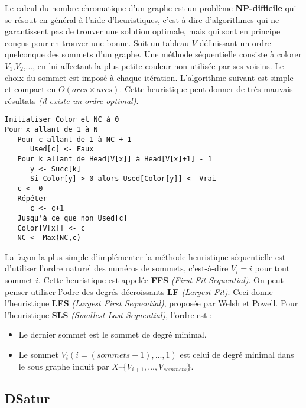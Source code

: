 \documentclass{article}
\begin{document}
Le calcul du nombre chromatique d’un graphe est un problème \textbf{NP-difficile} qui se résout en général à l’aide d’heuristiques, c’est-à-dire d’algorithmes qui ne garantissent 
pas de trouver une solution optimale, mais qui sont en principe conçus pour en trouver une bonne. Soit un tableau $V$ définissant un ordre quelconque des sommets d’un graphe. 
Une méthode séquentielle consiste à colorer $V_1$,$V_2$,..., en lui affectant la plus petite couleur non utilisée par ses voisins. Le choix du sommet est imposé à chaque itération.
L’algorithme suivant est simple et compact en $O(arcs \times arcs)$. Cette heuristique peut donner de très mauvais résultats \textit{(il existe un ordre optimal)}.
\begin{verbatim}
Initialiser Color et NC à 0
Pour x allant de 1 à N
   Pour c allant de 1 à NC + 1
      Used[c] <- Faux
   Pour k allant de Head[V[x]] à Head[V[x]+1] - 1
      y <- Succ[k]
      Si Color[y] > 0 alors Used[Color[y]] <- Vrai
   c <- 0
   Répéter
      c <- c+1
   Jusqu'à ce que non Used[c]
   Color[V[x]] <- c
   NC <- Max(NC,c)
\end{verbatim}
\newpage
La façon la plus simple d’implémenter la méthode heuristique séquentielle est d’utiliser l’ordre naturel des numéros de sommets, c’est-à-dire $V_i=i$ pour tout sommet $i$. Cette 
heuristique est appelée \textbf{FFS} \textit{(First Fit Sequential)}. On peut penser utiliser l’odre des degrés décroissants \textbf{LF} \textit{(Largest Fit)}. Ceci donne
l’heuristique \textbf{LFS} \textit{(Largest First Sequential)}, proposée par Welsh et Powell. Pour l’heuristique \textbf{SLS} \textit{(Smallest Last Sequential)}, l’ordre est :
\begin{itemize}
\item Le dernier sommet est le sommet de degré minimal.
\item Le sommet $V_i \left(i= (sommets-1),...,1\right)$ est celui de degré minimal dans le sous graphe induit par $X–\{V_{i+1},...,V_{sommets}\}$.
\end{itemize}

\subsection{DSatur}
\end{document}
